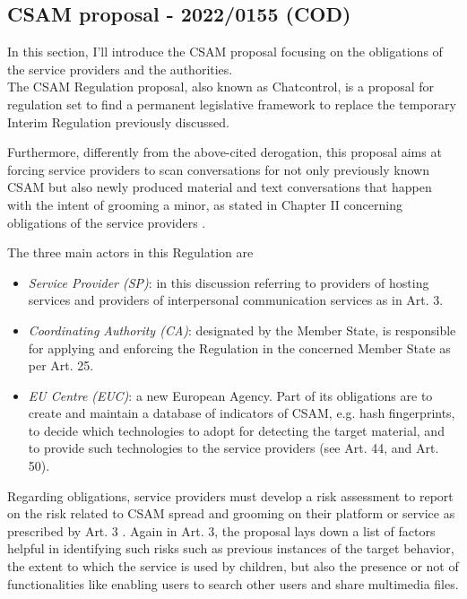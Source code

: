 \subsection{CSAM proposal - 2022/0155 (COD)}

In this section, I'll introduce the CSAM proposal focusing on the obligations of the service providers and the authorities. \\

The CSAM Regulation proposal, also known as Chatcontrol, is a proposal for regulation set to find a permanent legislative framework to replace the temporary Interim Regulation previously discussed. 

Furthermore, differently from the above-cited derogation, this proposal aims at forcing service providers to scan conversations for not only previously known CSAM but also newly produced material and text conversations that happen with the intent of grooming a minor, as stated in Chapter II concerning obligations of the service providers \cite {eu2023chatcontrol}.

The three main actors in this Regulation are

\begin{itemize}
    \item \textit{Service Provider (SP)}: in this discussion referring to providers of hosting services and providers of interpersonal communication services as in Art. 3.
    \item \textit{Coordinating Authority (CA)}: designated by the Member State, is responsible for applying and enforcing the Regulation in the concerned Member State as per Art. 25.
    \item \textit{EU Centre (EUC)}: a new European Agency. Part of its obligations are to create and maintain a database of indicators of CSAM, e.g. hash fingerprints, to decide which technologies to adopt for detecting the target material, and to provide such technologies to the service providers (see Art. 44, and Art. 50).
\end{itemize}

Regarding obligations, service providers must develop a risk assessment to report on the risk related to CSAM spread and grooming on their platform or service as prescribed by Art. 3 \cite{eu2023chatcontrol}. 
Again in Art. 3, the proposal lays down a list of factors helpful in identifying such risks such as previous instances of the target behavior, the extent to which the service is used by children, but also the presence or not of functionalities like enabling users to search other users and share multimedia files.

